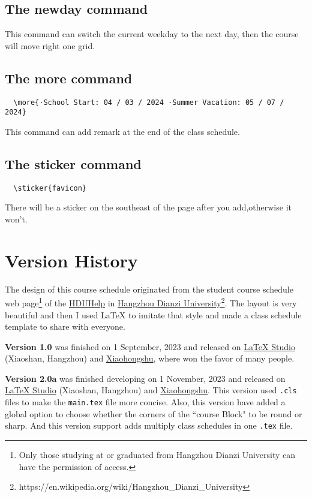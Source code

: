 \documentclass[11pt]{article}
\def\cmd#1{\texorpdfstring{\textcolor{cmdcolor}{\textsf{#1}}}{“#1”}}
\begin{document}
\subsection{The \cmd{newday} command}
This command can switch the current weekday to the next day, then the course will move right one grid.

\subsection{The \cmd{more} command}
\begin{verbatim}
  \more{·School Start: 04 / 03 / 2024 ·Summer Vacation: 05 / 07 / 2024}
\end{verbatim}
This command can add remark at the end of the class schedule.

\subsection{The \cmd{sticker} command}
\begin{verbatim}
  \sticker{favicon}
\end{verbatim}
There will be a sticker on the southeast of the page after you add,otherwise it won't.

\newpage
\section{Version History}

The design of this course schedule originated from the student course schedule web page\footnote{Only those studying at or graduated from Hangzhou Dianzi University can have the permission of access.} of the \href{https://www.hduhelp.cn/}{HDUHelp} in \href{https://www.hdu.edu.cn}{Hangzhou Dianzi University}\footnote{https://en.wikipedia.org/wiki/Hangzhou\_Dianzi\_University}. The layout is very beautiful and then I used \LaTeX{} to imitate that style and made a class schedule template to share with everyone.

\textsf{\bfseries Version 1.0} was finished on 1 September, 2023 and released on \href{https://www.latexstudio.net/index/details/index/mid/3625.html}{LaTeX Studio} (Xiaoshan, Hangzhou) and \href{http://xhslink.com/od7Ycw}{Xiaohongshu}, where won the favor of many people.

\textsf{\bfseries Version 2.0a} was finished developing on 1 November, 2023 and released on \href{https://www.latexstudio.net/index/details/index/mid/3636.html}{LaTeX Studio} (Xiaoshan, Hangzhou) and \href{http://xhslink.com/od7Ycw}{Xiaohongshu}. This version used \verb|.cls| files to make the \verb|main.tex| file more concise. Also, this version have added a global option to choose whether the corners of the ``course Block" to be round or sharp. And this version support adds multiply class schedules in one \verb|.tex| file.
\end{document}
